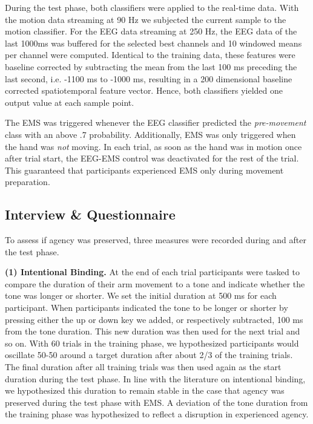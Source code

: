 During the test phase, both classifiers were applied to the real-time data. With the motion data streaming at 90 Hz we subjected the current sample to the motion classifier. For the EEG data streaming at 250 Hz, the EEG data of the last 1000ms was buffered for the selected best channels and 10 windowed means per channel were computed. Identical to the training data, these features were baseline corrected by subtracting the mean from the last 100 ms preceding the last second, i.e. -1100 ms to -1000 ms, resulting in a 200 dimensional baseline corrected spatiotemporal feature vector. Hence, both classifiers yielded one output value at each sample point.

The EMS was triggered whenever the EEG classifier predicted the \textit{pre-movement} class with an above .7 probability. Additionally, EMS was only triggered when the hand was \textit{not} moving. In each trial, as soon as the hand was in motion once after trial start, the EEG-EMS control was deactivated for the rest of the trial. This guaranteed that participants experienced EMS only during movement preparation.

\subsection{Interview \& Questionnaire}

To assess if agency was preserved, three measures were recorded during and after the test phase.

\indent\textbf{(1) Intentional Binding.}
At the end of each trial participants were tasked to compare the duration of their arm movement to a tone and indicate whether the tone was longer or shorter. We set the initial duration at 500 ms for each participant. When participants indicated the tone to be longer or shorter by pressing either the up or down key we added, or respectively subtracted, 100 ms from the tone duration. This new duration was then used for the next trial and so on. With 60 trials in the training phase, we hypothesized participants would oscillate 50-50 around a target duration after about 2/3 of the training trials. The final duration after all training trials was then used again as the start duration during the test phase. In line with the literature on intentional binding, we hypothesized this duration to remain stable in the case that agency was preserved during the test phase with EMS. A deviation of the tone duration from the training phase was hypothesized to reflect a disruption in experienced agency.


